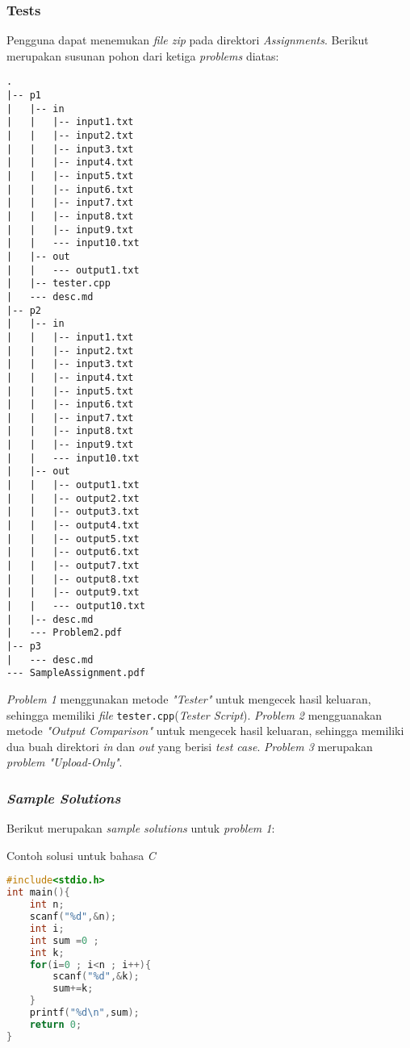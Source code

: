 \subsubsection{Tests}
Pengguna dapat menemukan \textit{file zip} pada direktori \textit{Assignments}. Berikut merupakan susunan pohon dari ketiga \textit{problems} diatas:

\begin{lstlisting}
.
|-- p1
|   |-- in
|   |   |-- input1.txt
|   |   |-- input2.txt
|   |   |-- input3.txt
|   |   |-- input4.txt
|   |   |-- input5.txt
|   |   |-- input6.txt
|   |   |-- input7.txt
|   |   |-- input8.txt
|   |   |-- input9.txt
|   |   --- input10.txt
|   |-- out
|   |   --- output1.txt
|   |-- tester.cpp
|   --- desc.md
|-- p2
|   |-- in
|   |   |-- input1.txt
|   |   |-- input2.txt
|   |   |-- input3.txt
|   |   |-- input4.txt
|   |   |-- input5.txt
|   |   |-- input6.txt
|   |   |-- input7.txt
|   |   |-- input8.txt
|   |   |-- input9.txt
|   |   --- input10.txt
|   |-- out
|   |   |-- output1.txt
|   |   |-- output2.txt
|   |   |-- output3.txt
|   |   |-- output4.txt
|   |   |-- output5.txt
|   |   |-- output6.txt
|   |   |-- output7.txt
|   |   |-- output8.txt
|   |   |-- output9.txt
|   |   --- output10.txt
|   |-- desc.md
|   --- Problem2.pdf
|-- p3
|   --- desc.md
--- SampleAssignment.pdf
\end{lstlisting}

\textit{Problem 1} menggunakan metode \textit{"Tester"} untuk mengecek hasil keluaran, sehingga memiliki \textit{file} \verb|tester.cpp|(\textit{Tester Script}). \textit{Problem 2} mengguanakan metode \textit{"Output Comparison"} untuk mengecek hasil keluaran, sehingga memiliki dua buah direktori \textit{in} dan \textit{out} yang berisi \textit{test case}. \textit{Problem 3} merupakan \textit{problem "Upload-Only"}.

\subsubsection{\textit{Sample Solutions}}
Berikut merupakan \textit{sample solutions} untuk \textit{problem 1}:

Contoh solusi untuk bahasa \textit{C}
\begin{lstlisting}[language=C, caption=Contoh skrip PHP, label=kode:samplesolutions1]
#include<stdio.h>
int main(){
	int n;
	scanf("%d",&n);
	int i;
	int sum =0 ;
	int k;
	for(i=0 ; i<n ; i++){
		scanf("%d",&k);
		sum+=k;
	}
	printf("%d\n",sum);
	return 0;
}
\end{lstlisting}


